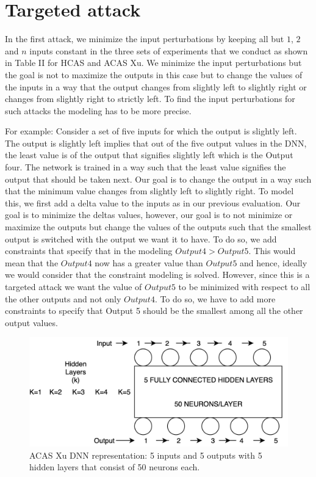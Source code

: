 \section{Targeted attack} 
In the first attack, we minimize the input perturbations by keeping all but $1$, $2$ and $n$ inputs constant in the three sets of experiments that we conduct as shown in Table II for HCAS and ACAS Xu. We minimize the input perturbations but the goal is not to maximize the outputs in this case but to change the values of the inputs in a way that the output changes from slightly left to slightly right or changes from slightly right to strictly left. To find the input perturbations for such attacks the modeling has to be more precise.

For example: Consider a set of five inputs for which the output is slightly left. The output is slightly left implies that out of the five output values in the DNN, the least value is of the output that signifies slightly left which is the Output four. The network is trained in a way such that the least value signifies the output that should be taken next. Our goal is to change the output in a way such that the minimum value changes from slightly left to slightly right. To model this, we first add a delta value to the inputs as in our previous evaluation. Our goal is to minimize the deltas values, however, our goal is to not minimize or maximize the outputs but change the values of the outputs such that the smallest output is switched with the output we want it to have. To do so, we add constraints that specify that in the modeling $Output 4 > Output 5$. This would mean that the $Output 4$ now has a greater value than $Output 5$ and hence, ideally we would consider that the constraint modeling is solved. However, since this is a targeted attack we want the value of $Output 5$ to be minimized with respect to all the other outputs and not only $Output 4$. To do so, we have to add more constraints to specify that Output 5 should be the smallest among all the other output values.

\begin{figure}
	\centering
	\includegraphics[width=0.7\linewidth]{Images/ACASXuDNN}
	\caption[ACAS Xu DNN]{ACAS Xu DNN representation: 5 inputs and 5 outputs with 5 hidden layers that consist of 50 neurons each.}
	\label{fig:acasxudnn}
\end{figure}

